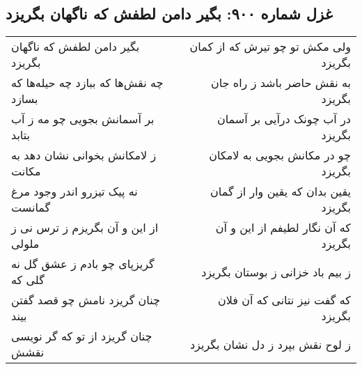 \begin{center}
\section*{غزل شماره ۹۰۰: بگیر دامن لطفش که ناگهان بگریزد}
\label{sec:0900}
\begin{longtable}{l p{0.5cm} r}
بگیر دامن لطفش که ناگهان بگریزد
&&
ولی مکش تو چو تیرش که از کمان بگریزد
\\
چه نقش‌ها که ببازد چه حیله‌ها که بسازد
&&
به نقش حاضر باشد ز راه جان بگریزد
\\
بر آسمانش بجویی چو مه ز آب بتابد
&&
در آب چونک درآیی بر آسمان بگریزد
\\
ز لامکانش بخوانی نشان دهد به مکانت
&&
چو در مکانش بجویی به لامکان بگریزد
\\
نه پیک تیزرو اندر وجود مرغ گمانست
&&
یقین بدان که یقین وار از گمان بگریزد
\\
از این و آن بگریزم ز ترس نی ز ملولی
&&
که آن نگار لطیفم از این و آن بگریزد
\\
گریزپای چو بادم ز عشق گل نه گلی که
&&
ز بیم باد خزانی ز بوستان بگریزد
\\
چنان گریزد نامش چو قصد گفتن بیند
&&
که گفت نیز نتانی که آن فلان بگریزد
\\
چنان گریزد از تو که گر نویسی نقشش
&&
ز لوح نقش بپرد ز دل نشان بگریزد
\\
\end{longtable}
\end{center}
